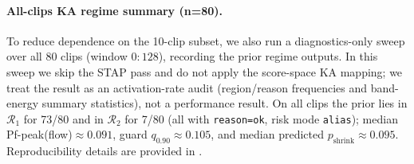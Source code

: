 \paragraph{All-clips KA regime summary (n=80).}
To reduce dependence on the 10-clip subset, we also run a diagnostics-only sweep over all 80 clips (window $0{:}128$), recording the prior regime outputs. In this sweep we skip the STAP pass and do not apply the score-space KA mapping; we treat the result as an activation-rate audit (region/reason frequencies and band-energy summary statistics), not a performance result. On all clips the prior lies in $\mathcal{R}_1$ for 73/80 and in $\mathcal{R}_2$ for 7/80 (all with \texttt{reason=ok}, risk mode \texttt{alias}); median Pf-peak(flow)$\approx 0.091$, guard $q_{0.90}\approx 0.105$, and median predicted $p_{\mathrm{shrink}}\approx 0.095$. Reproducibility details are provided in .

\begin{table}[t]
\centering
\small
{}
\caption{Shin RatBrain Fig3 prior-regime summary band-energy statistics for the frozen Shin-U profile ($e\approx 0.97$, $L_t=64$) across three overlapping windows (10 clips each).}
\label{tab:shin_contract_summary}
\end{table}

